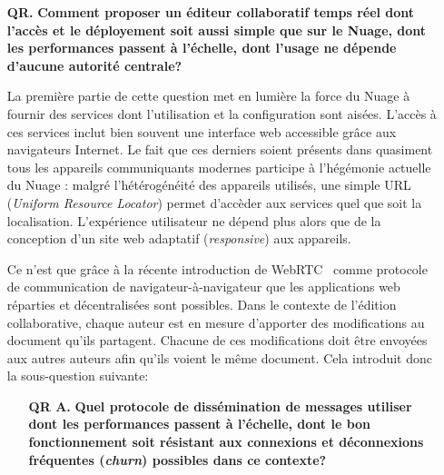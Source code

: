 \begin{itemize}
\item [\textbf{QR.}] \textbf{Comment proposer un éditeur collaboratif temps réel
    dont l'accès et le déployement soit aussi simple que sur le Nuage, dont les
    performances passent à l'échelle, dont l'usage ne dépende d'aucune autorité
    centrale?}
  
  La première partie de cette question met en lumière la force du Nuage à
  fournir des services dont l'utilisation et la configuration sont
  aisées. L'accès à ces services inclut bien souvent une interface web
  accessible grâce aux navigateurs Internet. Le fait que ces derniers soient
  présents dans quasiment tous les appareils communiquants modernes participe à
  l'hégémonie actuelle du Nuage : malgré l'hétérogénéité des appareils utilisés,
  une simple URL (\emph{Uniform Resource Locator}) permet d'accèder aux services
  quel que soit la localisation. L'expérience utilisateur ne dépend plus alors
  que de la conception d'un site web adaptatif (\emph{responsive}) aux
  appareils.

  Ce n'est que grâce à la récente introduction de WebRTC~\cite{webrtc} comme
  protocole de communication de navigateur-à-navigateur que les applications web
  réparties et décentralisées sont possibles. Dans le contexte de l'édition
  collaborative, chaque auteur est en mesure d'apporter des modifications au
  document qu'ils partagent. Chacune de ces modifications doit être envoyées aux
  autres auteurs afin qu'ils voient le même document.  Cela
  introduit donc la sous-question suivante:
  \begin{itemize}
  \item [\textbf{QR A.}] \textbf{Quel protocole de dissémination de messages
      utiliser dont les performances passent à l'échelle, dont le bon
      fonctionnement soit résistant aux connexions et déconnexions fréquentes
      (\emph{churn}) possibles dans ce contexte?}    
  \end{itemize}


\end{itemize}
